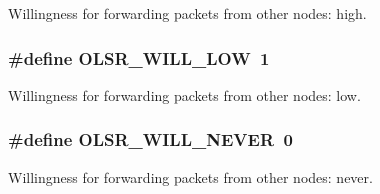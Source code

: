 Willingness for forwarding packets from other nodes\+: high. 

\subsubsection[{\texorpdfstring{O\+L\+S\+R\+\_\+\+W\+I\+L\+L\+\_\+\+L\+OW}{OLSR_WILL_LOW}}]{\setlength{\rightskip}{0pt plus 5cm}\#define O\+L\+S\+R\+\_\+\+W\+I\+L\+L\+\_\+\+L\+OW~1}\hypertarget{olsr-routing-protocol_8cc_af5179e8ea62927c15150f279ce4bf0c7}{}\label{olsr-routing-protocol_8cc_af5179e8ea62927c15150f279ce4bf0c7}


Willingness for forwarding packets from other nodes\+: low. 

\subsubsection[{\texorpdfstring{O\+L\+S\+R\+\_\+\+W\+I\+L\+L\+\_\+\+N\+E\+V\+ER}{OLSR_WILL_NEVER}}]{\setlength{\rightskip}{0pt plus 5cm}\#define O\+L\+S\+R\+\_\+\+W\+I\+L\+L\+\_\+\+N\+E\+V\+ER~0}\hypertarget{olsr-routing-protocol_8cc_a146d2c103abd49bdfad44b4424769696}{}\label{olsr-routing-protocol_8cc_a146d2c103abd49bdfad44b4424769696}


Willingness for forwarding packets from other nodes\+: never. 


